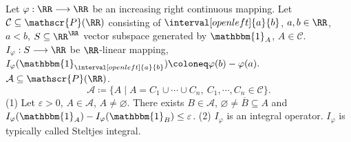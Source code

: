 \begin{propositionenv}
    Let $\varphi:\RR\longrightarrow \RR$ be an increasing right continuous mapping. Let $\mathcal{C}\subseteq \mathscr{P}(\RR)$ consisting of $\interval[open left]{a}{b}$, $a,b\in \RR$, $a<b$, $S\subseteq \RR^\RR$ vector subspace generated by $\mathbbm{1}_A$, $A\in \mathcal{C}$. $I_\varphi: S\longrightarrow \RR$ be $\RR$-linear mapping, $I_\varphi(\mathbbm{1}_{\interval[open left]{a}{b}})\coloneq \varphi(b)-\varphi(a).$ $\mathcal{A}\subseteq \mathscr{P}(\RR)$. 
    $$ \mathcal{A}\coloneq \{A\mid A=C_1\cup \cdots\cup C_n,\ C_1,\cdots,C_n\in \mathcal{C} \}.$$
    (1) Let $\varepsilon>0$, $A\in \mathcal{A}$, $A\neq\varnothing$. There exists $B\in \mathcal{A}$, $\varnothing\neq \overline{B}\subseteq A$ and $I_\varphi(\mathbbm{1}_A)-I_\varphi(\mathbbm{1}_B)\le \varepsilon$.
    \newline
    (2) $I_\varphi$ is an integral operator.
    \newline
    $I_\varphi$ is typically called Steltjes integral.
\end{propositionenv}
